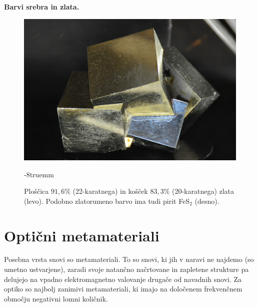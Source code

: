 \begin{example}{\bf Barvi srebra in zlata.}
\begin{figure}[htp]
\includegraphics[width=7truecm]{slike/09_pirit.jpg}
\caption{Ploščica $91,6\%$ (22-karatnega) in košček $83,3\%$ (20-karatnega) zlata (levo). 
Podobno zlatorumeno barvo ima tudi pirit FeS$_2$ (desno).}
\label{fig:09_zlato}
\vglue-8truemm
\end{figure}

\end{example}

\section{Optični metamateriali}
Posebna vrsta snovi so metamateriali. To so snovi, ki jih v naravi ne najdemo (so umetno
ustvarjene), zaradi svoje natančno načrtovane in zapletene strukture pa delujejo na 
vpadno elektromagnetno valovanje drugače od navadnih snovi. Za optiko so najbolj zanimivi
metamateriali, ki imajo na določenem frekvenčnem območju negativni lomni količnik.

